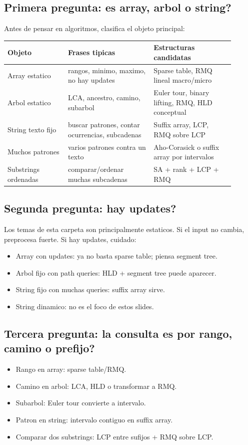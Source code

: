 \documentclass[10pt]{article}
\begin{document}
\subsection{Primera pregunta: es array, arbol o string?}
Antes de pensar en algoritmos, clasifica el objeto principal:
\begin{center}
\begin{tabular}{p{0.24\linewidth}p{0.34\linewidth}p{0.32\linewidth}}
\toprule
Objeto & Frases tipicas & Estructuras candidatas \\
\midrule
Array estatico & rangos, minimo, maximo, no hay updates & Sparse table, RMQ lineal macro/micro \\
Arbol estatico & LCA, ancestro, camino, subarbol & Euler tour, binary lifting, RMQ, HLD conceptual \\
String texto fijo & buscar patrones, contar ocurrencias, subcadenas & Suffix array, LCP, RMQ sobre LCP \\
Muchos patrones & varios patrones contra un texto & Aho-Corasick o suffix array por intervalos \\
Substrings ordenadas & comparar/ordenar muchas subcadenas & SA + rank + LCP + RMQ \\
\bottomrule
\end{tabular}
\end{center}

\subsection{Segunda pregunta: hay updates?}
Los temas de esta carpeta son principalmente estaticos. Si el input no cambia,
preprocesa fuerte. Si hay updates, cuidado:
\begin{itemize}[leftmargin=*]
\item Array con updates: ya no basta sparse table; piensa segment tree.
\item Arbol fijo con path queries: HLD + segment tree puede aparecer.
\item String fijo con muchas queries: suffix array sirve.
\item String dinamico: no es el foco de estos slides.
\end{itemize}

\subsection{Tercera pregunta: la consulta es por rango, camino o prefijo?}
\begin{itemize}[leftmargin=*]
\item Rango en array: sparse table/RMQ.
\item Camino en arbol: LCA, HLD o transformar a RMQ.
\item Subarbol: Euler tour convierte a intervalo.
\item Patron en string: intervalo contiguo en suffix array.
\item Comparar dos substrings: LCP entre sufijos + RMQ sobre LCP.
\end{itemize}
\end{document}
